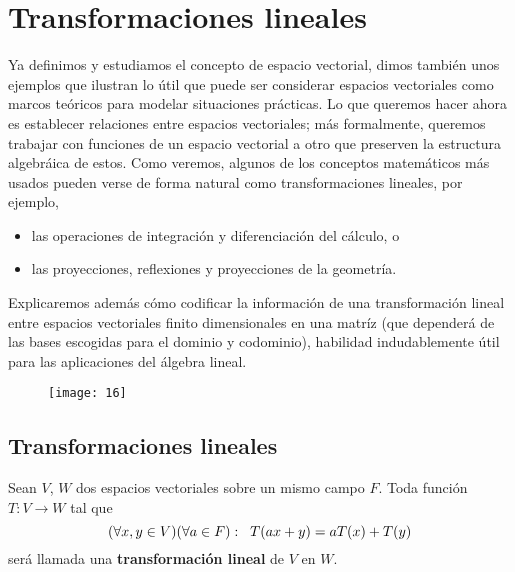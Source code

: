 \chapter{Transformaciones lineales}

Ya definimos y estudiamos el concepto de espacio vectorial, dimos
también unos ejemplos que ilustran lo útil que puede ser considerar
espacios vectoriales como marcos teóricos para modelar situaciones
prácticas. Lo que queremos hacer ahora es establecer relaciones entre
espacios vectoriales; más formalmente, queremos 
trabajar con funciones de un espacio vectorial a otro
que preserven la estructura algebráica de estos. Como veremos,
algunos de los conceptos matemáticos más usados pueden
verse de forma natural como transformaciones lineales, por ejemplo,
\begin{itemize}
	\item las operaciones de integración y diferenciación
	del cálculo, o 
	\item las proyecciones, reflexiones y proyecciones de
	la geometría.
\end{itemize}

Explicaremos además cómo codificar la información de una
transformación lineal entre espacios vectoriales finito
dimensionales en una matríz (que dependerá de las bases
escogidas para el dominio y codominio), habilidad indudablemente
útil para las aplicaciones del álgebra lineal.

\begin{figure}[H]
	\centering
	\texttt{[image: 16]} 
\end{figure}	

\section{Transformaciones lineales}

\begin{defi}
Sean $V$, $W$ dos espacios vectoriales sobre un mismo campo $F$.
Toda función $T: V \longrightarrow W$ tal que
\begin{equation}
	\label{eq: condicion linealidad}
(\forall x, y \in V) (\forall a \in F): \hspace{0.2cm}
T(ax + y) = a T(x) + T(y)
\end{equation}
será llamada una \textbf{transformación lineal} de $V$ en $W$.
\end{defi}


